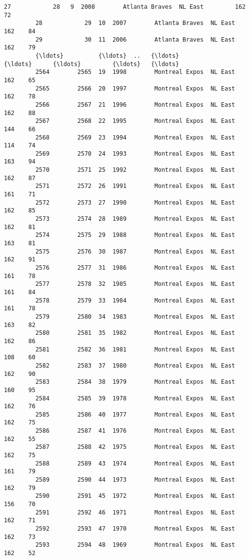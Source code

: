 \documentclass[11pt]{article}
\begin{document}
\begin{Verbatim}[commandchars=\\\{\}]
         27            28   9  2008        Atlanta Braves  NL East         162    72   
         28            29  10  2007        Atlanta Braves  NL East         162    84   
         29            30  11  2006        Atlanta Braves  NL East         162    79   
         {\ldots}          {\ldots}  ..   {\ldots}                   {\ldots}      {\ldots}         {\ldots}   {\ldots}   
         2564        2565  19  1998        Montreal Expos  NL East         162    65   
         2565        2566  20  1997        Montreal Expos  NL East         162    78   
         2566        2567  21  1996        Montreal Expos  NL East         162    88   
         2567        2568  22  1995        Montreal Expos  NL East         144    66   
         2568        2569  23  1994        Montreal Expos  NL East         114    74   
         2569        2570  24  1993        Montreal Expos  NL East         163    94   
         2570        2571  25  1992        Montreal Expos  NL East         162    87   
         2571        2572  26  1991        Montreal Expos  NL East         161    71   
         2572        2573  27  1990        Montreal Expos  NL East         162    85   
         2573        2574  28  1989        Montreal Expos  NL East         162    81   
         2574        2575  29  1988        Montreal Expos  NL East         163    81   
         2575        2576  30  1987        Montreal Expos  NL East         162    91   
         2576        2577  31  1986        Montreal Expos  NL East         161    78   
         2577        2578  32  1985        Montreal Expos  NL East         161    84   
         2578        2579  33  1984        Montreal Expos  NL East         161    78   
         2579        2580  34  1983        Montreal Expos  NL East         163    82   
         2580        2581  35  1982        Montreal Expos  NL East         162    86   
         2581        2582  36  1981        Montreal Expos  NL East         108    60   
         2582        2583  37  1980        Montreal Expos  NL East         162    90   
         2583        2584  38  1979        Montreal Expos  NL East         160    95   
         2584        2585  39  1978        Montreal Expos  NL East         162    76   
         2585        2586  40  1977        Montreal Expos  NL East         162    75   
         2586        2587  41  1976        Montreal Expos  NL East         162    55   
         2587        2588  42  1975        Montreal Expos  NL East         162    75   
         2588        2589  43  1974        Montreal Expos  NL East         161    79   
         2589        2590  44  1973        Montreal Expos  NL East         162    79   
         2590        2591  45  1972        Montreal Expos  NL East         156    70   
         2591        2592  46  1971        Montreal Expos  NL East         162    71   
         2592        2593  47  1970        Montreal Expos  NL East         162    73   
         2593        2594  48  1969        Montreal Expos  NL East         162    52   
         

\end{Verbatim}
\end{document}
